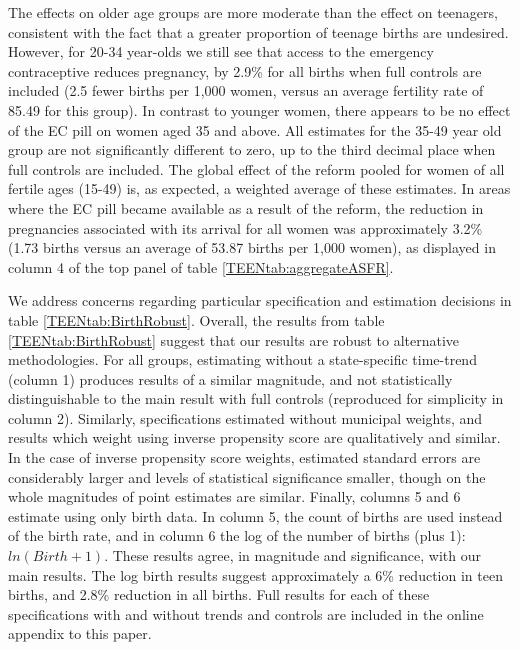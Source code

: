 The effects on older age groups are more moderate than the effect on teenagers,
consistent with the fact that a greater proportion of teenage births are
undesired.  However, for 20-34 year-olds we still see that access to the 
emergency contraceptive reduces pregnancy, by 2.9\% for all births when full 
controls are included (2.5 fewer births per 1,000 women, versus an average
fertility rate of 85.49 for this group).  In contrast to younger women, there 
appears to be no effect of the EC pill on women aged 35 and above.  
All estimates for the 35-49 year old group are not significantly different to 
zero, up to the third decimal place when full controls are included.  The global 
effect of the reform pooled for women of all fertile ages (15-49) is, as 
expected, a weighted average of these estimates.  In areas where the EC pill
became available as a result of the reform, the reduction in pregnancies 
associated with its arrival for all women was approximately 3.2\% (1.73 births
versus an average of 53.87 births per 1,000 women), as displayed in column 4 of
the top panel of table \ref{TEENtab:aggregateASFR}.

We address concerns regarding particular specification and estimation decisions
in table \ref{TEENtab:BirthRobust}.  Overall, the results from table 
\ref{TEENtab:BirthRobust} suggest that our results are robust to alternative
methodologies.  For all groups, estimating without a state-specific time-trend
(column 1) produces results of a similar magnitude, and not statistically
distinguishable to the main result with full controls (reproduced for simplicity
in column 2).  Similarly, specifications estimated without municipal weights,
and results which weight using inverse propensity score are qualitatively and
similar.  In the case of inverse propensity score weights, estimated standard
errors are considerably larger and levels of statistical significance smaller,
though on the whole magnitudes of point estimates are similar.  Finally, columns
5 and 6 estimate using only birth data.  In column 5, the count of births are
used instead of the birth rate, and in column 6 the log of the number of births
(plus 1): $ln(Birth+1)$.  These results agree, in magnitude and significance,
with our main results.  The log birth results suggest approximately a 6\%
reduction in teen births, and 2.8\% reduction in all births.  Full results for
each of these specifications with and without trends and controls are included
in the online appendix to this paper.


